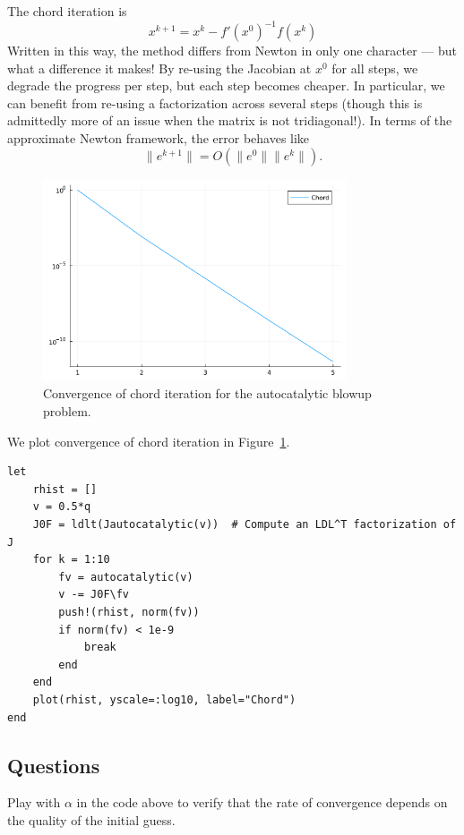 \documentclass[12pt, leqno]{article} %
\begin{document}
The chord iteration is \[x^{k+1} = x^k - f'(x^0)^{-1} f(x^k)\] Written
in this way, the method differs from Newton in only one character ---
but what a difference it makes! By re-using the Jacobian at \(x^0\) for
all steps, we degrade the progress per step, but each step becomes
cheaper. In particular, we can benefit from re-using a factorization
across several steps (though this is admittedly more of an issue when
the matrix is not tridiagonal!). In terms of the approximate Newton
framework, the error behaves like \[\|e^{k+1}\| = O(\|e^0\| \|e^k\|).\]

\begin{figure}
\begin{center}
  \includegraphics[width=0.8\textwidth]{fig/2023-04-12-chord.pdf}
\end{center}
\caption{Convergence of chord iteration for the autocatalytic blowup problem.}
\label{fig:chord-cvg}
\end{figure}

We plot convergence of chord iteration in Figure~\ref{fig:chord-cvg}.

\begin{verbatim}
let
    rhist = []
    v = 0.5*q
    J0F = ldlt(Jautocatalytic(v))  # Compute an LDL^T factorization of J
    for k = 1:10
    	fv = autocatalytic(v)
    	v -= J0F\fv
    	push!(rhist, norm(fv))
    	if norm(fv) < 1e-9
            break
    	end
    end
    plot(rhist, yscale=:log10, label="Chord")
end
\end{verbatim}

\subsection{Questions}

Play with \(\alpha\) in the code above to verify that the rate of
convergence depends on the quality of the initial guess.
\end{document}
